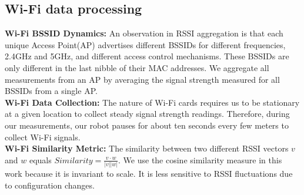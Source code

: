 \subsection{Wi-Fi data processing}
{\bf Wi-Fi BSSID Dynamics: }An observation in RSSI aggregation is that each unique Access Point(AP) advertises different BSSIDs for different frequencies, 2.4GHz and 5GHz, and different access control mechanisms. These BSSIDs are only different in the last nibble of their MAC addresses. We aggregate all measurements from an AP by averaging the signal strength measured for all BSSIDs from a single AP.\\
{\bf Wi-Fi Data Collection:} The nature of Wi-Fi cards requires us to be stationary at a given location to collect steady signal strength readings. Therefore, during our measurements, our robot pauses for about ten seconds every few meters to collect Wi-Fi signals. \\
{\bf Wi-Fi Similarity Metric:}  The similarity between two different RSSI vectors $v$ and $w$ equals
$Similarity=\frac{v\cdot w}{\lvert v \rvert\lvert w \rvert}$. We use the cosine similarity measure in this work because it is invariant to scale. It is less sensitive to RSSI fluctuations due to configuration changes. 
